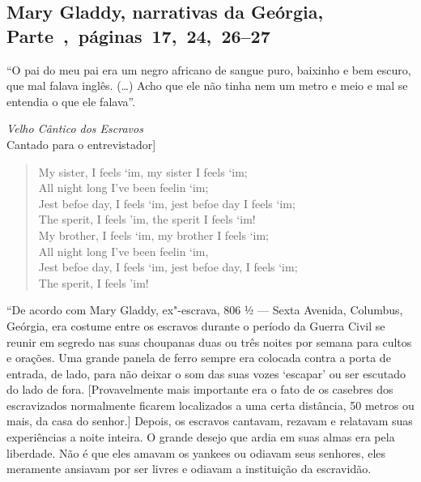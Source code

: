 \subsection{Mary Gladdy, narrativas da Geórgia, Parte~,~páginas~17,~24,~26--27}
\label{ref106}

``O pai do meu pai era um negro africano de sangue puro, baixinho e bem
escuro, que mal falava inglês. (\ldots{}) Acho que ele não tinha nem um
metro e meio e mal se entendia o que ele falava''.


\noindent{}\emph{Velho Cântico dos Escravos}\\
\noindent{}{[}Cantado para o entrevistador{]}

\begin{verse}
My sister, I feels `im, my sister I feels `im;\\
All night long I've been feelin `im;\\
Jest befoe day, I feels `im, jest befoe day I feels `im;\\
The sperit, I feels 'im, the sperit I feels `im!\\
My brother, I feels `im, my brother I feels `im;\\
All night long I've been feelin `im,\\
Jest befoe day, I feels `im, jest befoe day, I feels `im;\\
The sperit, I feels 'im!\footnotemark
\end{verse}


``De acordo com Mary Gladdy, ex"-escrava, 806 ½ --- Sexta Avenida,
Columbus, Geórgia, era costume entre os escravos durante o período da
Guerra Civil se reunir em segredo nas suas choupanas duas ou três noites
por semana para cultos e orações. Uma grande panela de ferro sempre era
colocada contra a porta de entrada, de lado, para não deixar o som das
suas vozes `escapar' ou ser escutado do lado de fora. {[}Provavelmente
mais importante era o fato de os casebres dos escravizados normalmente
ficarem localizados a uma certa distância, 50 metros ou mais, da casa do
senhor.{]} Depois, os escravos cantavam, rezavam e relatavam suas
experiências a noite inteira. O grande desejo que ardia em suas almas
era pela liberdade. Não é que eles amavam os yankees ou odiavam seus
senhores, eles meramente ansiavam por ser livres e odiavam a instituição
da escravidão.

